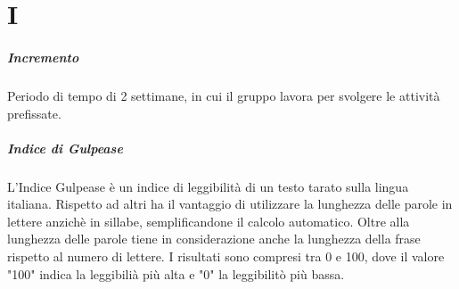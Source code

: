 \chapter{I}

\paragraph*{Incremento}
Periodo di tempo di 2 settimane, in cui il gruppo lavora per svolgere le attività prefissate.

\paragraph*{Indice di Gulpease}
L'Indice Gulpease è un indice di leggibilità di un testo tarato sulla lingua italiana. Rispetto ad altri ha il vantaggio di utilizzare la lunghezza delle parole in lettere anzichè in sillabe, semplificandone il calcolo automatico. Oltre alla lunghezza delle parole tiene in considerazione anche la lunghezza della frase rispetto al numero di lettere. I risultati sono compresi tra 0 e 100, dove il valore "100" indica la leggibilià più alta e "0" la leggibilitò più bassa.
